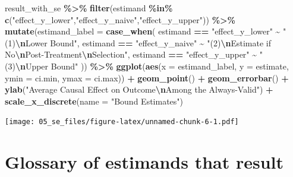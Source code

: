 \documentclass[
]{book}
\newenvironment{Shaded}{\begin{snugshade}}{\end{snugshade}}
\newcommand{\AttributeTok}[1]{\textcolor[rgb]{0.13,0.29,0.53}{#1}}
\newcommand{\FunctionTok}[1]{\textcolor[rgb]{0.13,0.29,0.53}{\textbf{#1}}}
\newcommand{\NormalTok}[1]{#1}
\newcommand{\SpecialCharTok}[1]{\textcolor[rgb]{0.81,0.36,0.00}{\textbf{#1}}}
\newcommand{\StringTok}[1]{\textcolor[rgb]{0.31,0.60,0.02}{#1}}
\begin{document}
\begin{Shaded}
\begin{Highlighting}[]
\NormalTok{result\_with\_se }\SpecialCharTok{\%\textgreater{}\%}
  \FunctionTok{filter}\NormalTok{(estimand }\SpecialCharTok{\%in\%} \FunctionTok{c}\NormalTok{(}\StringTok{"effect\_y\_lower"}\NormalTok{,}\StringTok{"effect\_y\_naive"}\NormalTok{,}\StringTok{"effect\_y\_upper"}\NormalTok{)) }\SpecialCharTok{\%\textgreater{}\%}
  \FunctionTok{mutate}\NormalTok{(}\AttributeTok{estimand\_label =} \FunctionTok{case\_when}\NormalTok{(}
\NormalTok{    estimand }\SpecialCharTok{==} \StringTok{"effect\_y\_lower"} \SpecialCharTok{\textasciitilde{}} \StringTok{"(1)}\SpecialCharTok{\textbackslash{}n}\StringTok{Lower Bound"}\NormalTok{,}
\NormalTok{    estimand }\SpecialCharTok{==} \StringTok{"effect\_y\_naive"} \SpecialCharTok{\textasciitilde{}} \StringTok{"(2)}\SpecialCharTok{\textbackslash{}n}\StringTok{Estimate if No}\SpecialCharTok{\textbackslash{}n}\StringTok{Post{-}Treatment}\SpecialCharTok{\textbackslash{}n}\StringTok{Selection"}\NormalTok{,}
\NormalTok{    estimand }\SpecialCharTok{==} \StringTok{"effect\_y\_upper"} \SpecialCharTok{\textasciitilde{}} \StringTok{"(3)}\SpecialCharTok{\textbackslash{}n}\StringTok{Upper Bound"}
\NormalTok{  )) }\SpecialCharTok{\%\textgreater{}\%}
  \FunctionTok{ggplot}\NormalTok{(}\FunctionTok{aes}\NormalTok{(}\AttributeTok{x =}\NormalTok{ estimand\_label, }\AttributeTok{y =}\NormalTok{ estimate,}
             \AttributeTok{ymin =}\NormalTok{ ci.min, }\AttributeTok{ymax =}\NormalTok{ ci.max)) }\SpecialCharTok{+}
  \FunctionTok{geom\_point}\NormalTok{() }\SpecialCharTok{+}
  \FunctionTok{geom\_errorbar}\NormalTok{() }\SpecialCharTok{+}
  \FunctionTok{ylab}\NormalTok{(}\StringTok{"Average Causal Effect on Outcome}\SpecialCharTok{\textbackslash{}n}\StringTok{Among the Always{-}Valid"}\NormalTok{) }\SpecialCharTok{+}
  \FunctionTok{scale\_x\_discrete}\NormalTok{(}\AttributeTok{name =} \StringTok{"Bound Estimates"}\NormalTok{)}
\end{Highlighting}
\end{Shaded}

\texttt{[image: 05\_se\_files/figure-latex/unnamed-chunk-6-1.pdf]}

\section{Glossary of estimands that result}\label{glossary-of-estimands-that-result}
\end{document}
